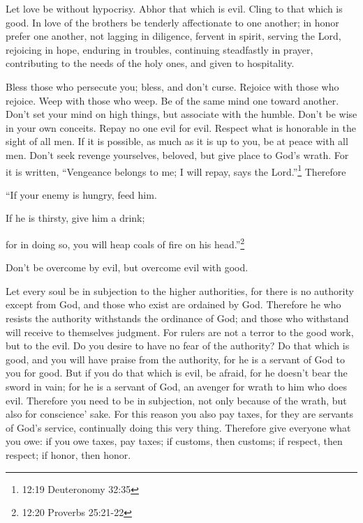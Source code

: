 \myverse{}Let love be without hypocrisy. Abhor that which is evil. Cling
to that which is good.
\myverse{}In love of the brothers be tenderly affectionate to one another; in honor
prefer one another,
\myverse{}not lagging in diligence, fervent in spirit, serving the Lord,
\myverse{}rejoicing in hope, enduring in troubles, continuing steadfastly in prayer,
\myverse{}contributing to the needs of the holy ones, and given to hospitality.

\myverse{}Bless those who persecute you; bless, and don’t curse.
\myverse{}Rejoice with those who rejoice. Weep with those who weep.
\myverse{}Be of the same mind one toward another. Don’t set your mind on high things,
but associate with the humble. Don’t be wise in your own conceits.
\myverse{}Repay no one evil for evil. Respect what is honorable in the sight of all
men.
\myverse{}If it is possible, as much as it is up to you, be at peace with all men.
\myverse{}Don’t seek revenge yourselves, beloved, but give place to God’s wrath. For
it is written, “Vengeance belongs to me; I will repay, says the Lord.”\footnote{12:19 Deuteronomy 32:35}
\myverse{}Therefore

“If your enemy is hungry, feed him.

If he is thirsty, give him a drink;

for in doing so, you will heap coals of fire on his head.”\footnote{12:20 Proverbs 25:21-22}

\myverse{}Don’t be overcome by evil, but overcome evil with good.


\mychapter{} \myverse*{}Let every soul be in subjection to the higher authorities, for
there is no authority except from God, and those who exist are ordained by God.
\myverse{}Therefore he who resists the authority withstands the ordinance of God; and
those who withstand will receive to themselves judgment.
\myverse{}For rulers are not a terror to the good work, but to the evil. Do you desire
to have no fear of the authority? Do that which is good, and you will have praise from the authority,
\myverse{}for he is a servant of God to you for good. But if you do that which is evil,
be afraid, for he doesn’t bear the sword in vain; for he is a servant of God, an avenger for wrath to
him who does evil.
\myverse{}Therefore you need to be in subjection, not only because of the wrath, but
also for conscience’ sake.
\myverse{}For this reason you also pay taxes, for they are servants of God’s service,
continually doing this very thing.
\myverse{}Therefore give everyone what you owe: if you owe taxes, pay taxes; if customs,
then customs; if respect, then respect; if honor, then honor.

